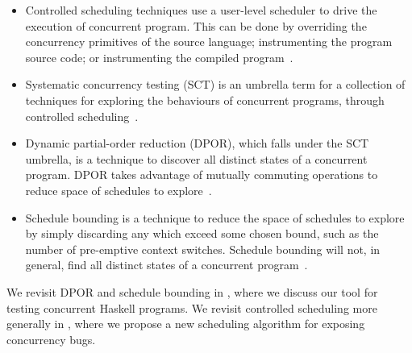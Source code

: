 \begin{itemize}
\item Controlled scheduling techniques use a user-level scheduler to
  drive the execution of concurrent program.  This can be done by
  overriding the concurrency primitives of the source language;
  instrumenting the program source code; or instrumenting the compiled
  program~.

\item Systematic concurrency testing (SCT) is an umbrella term for a
  collection of techniques for exploring the behaviours of concurrent
  programs, through controlled scheduling~.

\item Dynamic partial-order reduction (DPOR), which falls under the
  SCT umbrella, is a technique to discover all distinct states of a
  concurrent program.  DPOR takes advantage of mutually commuting
  operations to reduce space of schedules to explore~.

\item Schedule bounding is a technique to reduce the space of
  schedules to explore by simply discarding any which exceed some
  chosen bound, such as the number of pre-emptive context switches.
  Schedule bounding will not, in general, find all distinct states of
  a concurrent program~.
\end{itemize}

We revisit DPOR and schedule bounding in , where we
discuss our tool for testing concurrent Haskell programs.  We revisit
controlled scheduling more generally in , where
we propose a new scheduling algorithm for exposing concurrency bugs.
